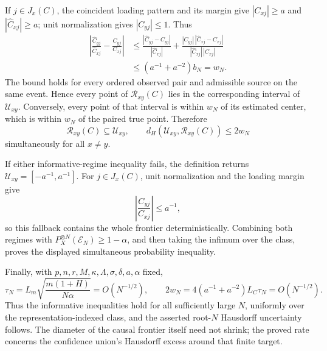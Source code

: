If \(j\in J_x(C)\), the coincident loading pattern and its margin give \(|C_{xj}|\ge a\) and \(|\widehat C_{xj}|\ge a\); unit normalization gives \(|C_{yj}|\le1\). Thus
\[
 \begin{aligned}
 \left|\frac{\widehat C_{yj}}{\widehat C_{xj}}-
             \frac{C_{yj}}{C_{xj}}\right|
 &\le \frac{|\widehat C_{yj}-C_{yj}|}{|\widehat C_{xj}|}
 +\frac{|C_{yj}|\,|\widehat C_{xj}-C_{xj}|}
 {|\widehat C_{xj}|\,|C_{xj}|}\\
 &\le(a^{-1}+a^{-2})b_N=w_N.
 \end{aligned}
\]
The bound holds for every ordered observed pair and admissible source on the same event. Hence every point of \(\mathcal R_{xy}(C)\) lies in the corresponding interval of \(\mathcal U_{xy}\). Conversely, every point of that interval is within \(w_N\) of its estimated center, which is within \(w_N\) of the paired true point. Therefore
\[
 \mathcal R_{xy}(C)\subseteq\mathcal U_{xy},
 \qquad
 d_H(\mathcal U_{xy},\mathcal R_{xy}(C))\le2w_N
\]
simultaneously for all \(x\ne y\).

If either informative-regime inequality fails, the definition returns \(\mathcal U_{xy}=[-a^{-1},a^{-1}]\). For \(j\in J_x(C)\), unit normalization and the loading margin give
\[
 \left|\frac{C_{yj}}{C_{xj}}\right|\le a^{-1},
\]
so this fallback contains the whole frontier deterministically. Combining both regimes with \(P_X^{\otimes N}(\mathcal E_N)\ge1-\alpha\), and then taking the infimum over the class, proves the displayed simultaneous probability inequality.

Finally, with \(p,n,r,M,\kappa,\Lambda,\sigma,\delta,a,\alpha\) fixed,
\[
 \tau_N=L_m\sqrt{\frac{m(1+H)}{N\alpha}}=O(N^{-1/2}),
 \qquad
 2w_N=4(a^{-1}+a^{-2})L_C\tau_N=O(N^{-1/2}).
\]
Thus the informative inequalities hold for all sufficiently large \(N\), uniformly over the representation-indexed class, and the asserted root-\(N\) Hausdorff uncertainty follows. The diameter of the causal frontier itself need not shrink; the proved rate concerns the confidence union's Hausdorff excess around that finite target.